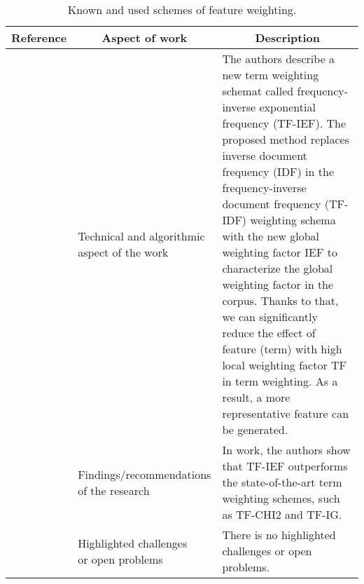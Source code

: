 \begin{landscape}
    \begin{longtable}{lp{}p{}}
    \caption{Known and used schemes of feature weighting.} \\
    \hline    
    Reference & \multicolumn{1}{c}{Aspect of work} & \multicolumn{1}{c}{Description} \\
	\hline
	
	\multirow{3}[0]{*}{~\citep{Tang2020}} & 
    \specialcell{Technical and algorithmic \\ aspect of the work} &
    The authors describe a new term weighting schemat called frequency-inverse exponential frequency (TF-IEF). The proposed method replaces inverse document frequency (IDF) in the frequency-inverse document frequency (TF-IDF) weighting schema with the new global weighting factor IEF to characterize the global weighting factor in the corpus. Thanks to that, we can significantly reduce the effect of feature (term) with high local weighting factor TF in term weighting. As a result, a more representative feature can be generated. 
    \\ & 
    \specialcell{Findings/recommendations \\ of the research} & 
    In work, the authors show that TF-IEF outperforms the state-of-the-art term weighting schemes, such as TF-CHI2 and TF-IG.
    \\ & 
    \specialcell{Highlighted challenges \\ or open problems} & 
    There is no highlighted challenges or open problems.
    \\
    

\end{longtable}
\end{landscape}
